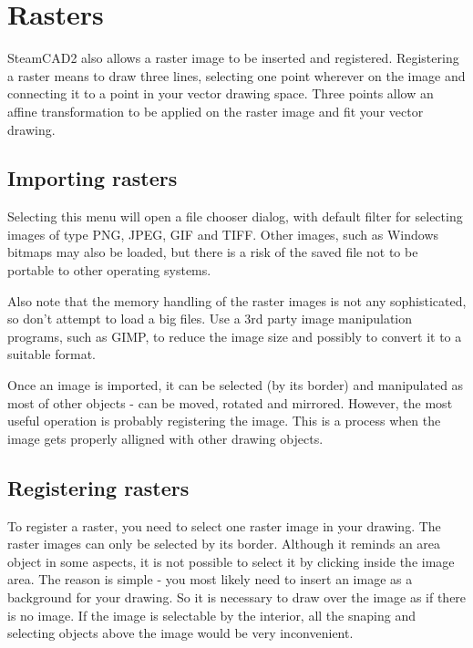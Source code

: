 \chapter{Rasters}\label{chap:chap5}

SteamCAD2 also allows a raster image to be inserted and registered. Registering a raster
means to draw three lines, selecting one point wherever on the image and connecting it
to a point in your vector drawing space. Three points allow an affine transformation
to be applied on the raster image and fit your vector drawing.

\section{Importing rasters}\label{sec:impraster}

Selecting this menu will open a file chooser dialog, with default filter for selecting
images of type PNG, JPEG, GIF and TIFF. Other images, such as Windows bitmaps may also
be loaded, but there is a risk of the saved file not to be portable to other operating
systems.

Also note that the memory handling of the raster images is not any sophisticated, so don't
attempt to load a big files. Use a 3rd party image manipulation programs, such as GIMP, to
reduce the image size and possibly to convert it to a suitable format.

Once an image is imported, it can be selected (by its border) and manipulated as most
of other objects - can be moved, rotated and mirrored. However, the most useful
operation is probably registering the image. This is a process when the image gets
properly alligned with other drawing objects.

\section{Registering rasters}\label{sec:regraster}

To register a raster, you need to select one raster image in your drawing. The raster
images can only be selected by its border. Although it reminds an area object in some
aspects, it is not possible to select it by clicking inside the image area. The reason
is simple - you most likely need to insert an image as a background for your drawing.
So it is necessary to draw over the image as if there is no image. If the image is
selectable by the interior, all the snaping and selecting objects above the image would
be very inconvenient.

